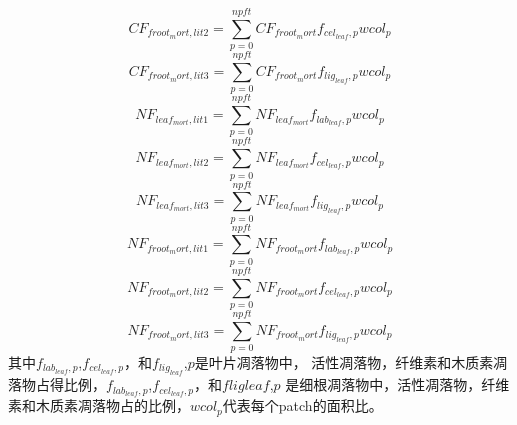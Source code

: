\begin{equation}
  CF_{froot_mort,lit2}=\sum_{p=0}^{npft}{CF_{froot_mort}f_{cel_{leaf},p}{wcol_p}}
\end{equation}
\begin{equation}
  CF_{froot_mort,lit3}=\sum_{p=0}^{npft}{CF_{froot_mort}f_{lig_{leaf},p}{wcol_p}}
\end{equation}
\begin{equation}
  NF_{leaf_{mort},lit1}=\sum_{p=0}^{npft}{NF_{leaf_{mort}}f_{lab_{leaf},p}{wcol_p}}
\end{equation}
\begin{equation}
  NF_{leaf_{mort},lit2}=\sum_{p=0}^{npft}{NF_{leaf_{mort}}f_{cel_{leaf},p}{wcol_p}}
\end{equation}
\begin{equation}
  NF_{leaf_{mort},lit3}=\sum_{p=0}^{npft}{NF_{leaf_{mort}}f_{lig_{leaf},p}{wcol_p}}
\end{equation}
\begin{equation}
  NF_{froot_mort,lit1}=\sum_{p=0}^{npft}{NF_{froot_mort}f_{lab_{leaf},p}{wcol_p}}
\end{equation}
\begin{equation}
  NF_{froot_mort,lit2}=\sum_{p=0}^{npft}{NF_{froot_mort}f_{cel_{leaf},p}{wcol_p}}
\end{equation}
\begin{equation}
  NF_{froot_mort,lit3}=\sum_{p=0}^{npft}{NF_{froot_mort}f_{lig_{leaf},p}{wcol_p}}
\end{equation}
其中$f_{lab_{leaf},p}$,$f_{cel_{leaf},p}$，和$f_{lig_{leaf}}$,$p $是叶片凋落物中，
活性凋落物，纤维素和木质素凋落物占得比例，$f_{lab_{leaf},p}$,$f_{cel_{leaf},p}$，和$fligleaf$,$p $
是细根凋落物中，活性凋落物，纤维素和木质素凋落物占的比例，${wcol_p}$代表每个patch的面积比。


